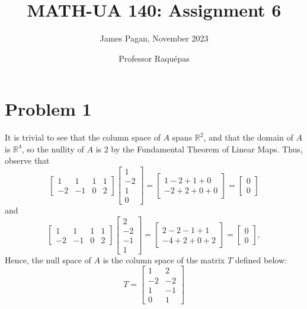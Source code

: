 \documentclass[11pt]{article}
\title{MATH-UA 140: Assignment 6}
\author{James Pagan, November 2023}
\date{Professor Raquépas}
\begin{document}
\maketitle
\tableofcontents


\section{Problem 1}

It is trivial to see that the column space of $A$ spans $\mathbb{R}^{2}$, and that the domain of $A$ is $\mathbb{R}^{4}$, so the nullity of $A$ is $2$ by the Fundamental Theorem of Linear Maps. Thus, observe that
\[
	\begin{bmatrix} 1 & 1 & 1 & 1 \\ -2 & -1 & 0 & 2 \end{bmatrix}\begin{bmatrix} 1 \\ -2 \\ 1 \\ 0 \end{bmatrix} = \begin{bmatrix} 1 - 2 + 1 + 0 \\ -2 + 2 + 0 + 0 \end{bmatrix} = \begin{bmatrix} 0 \\ 0 \end{bmatrix}
\]
and
\[
	\begin{bmatrix} 1 & 1 & 1 & 1 \\ -2 & -1 & 0 & 2 \end{bmatrix}\begin{bmatrix} 2 \\ -2 \\ -1 \\ 1 \end{bmatrix} = \begin{bmatrix} 2 - 2 - 1 + 1 \\ -4 + 2 + 0 + 2 \end{bmatrix} = \begin{bmatrix} 0 \\ 0 \end{bmatrix},
\]
Hence, the null space of $A$ is the column space of the matrix $T$ defined below:
\[
	T = \begin{bmatrix} 1 & 2 \\ -2 & -2 \\ 1 & -1 \\ 0 & 1 \end{bmatrix}
\]
\end{document}
